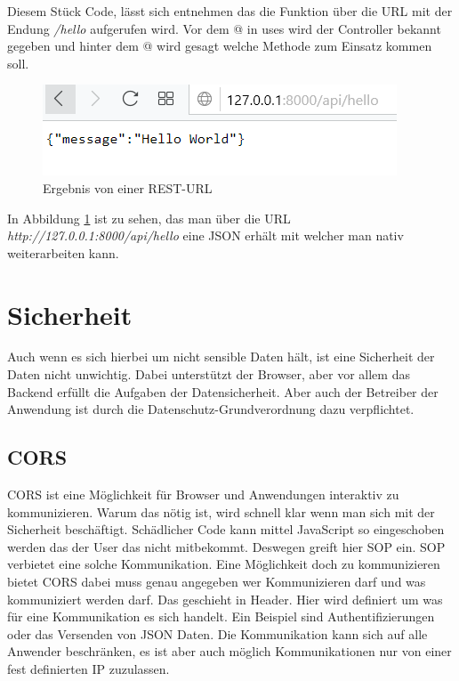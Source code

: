 Diesem Stück Code, lässt sich entnehmen das die Funktion über die \ac{URL} mit der Endung \textit{/hello} aufgerufen wird. Vor dem @ in uses wird der Controller bekannt gegeben und hinter dem @ wird gesagt welche Methode zum Einsatz kommen soll.

\begin{figure}[H]
	\centering
	\includegraphics{content/pictures/restresult.png}
	\caption{ Ergebnis von einer REST-URL}
	\label{fig:restresult}
\end{figure}

In Abbildung \ref{fig:restresult} ist zu sehen, das man über die \ac{URL} \textit{http://127.0.0.1:8000/api/hello} eine \ac{JSON} erhält mit welcher man nativ weiterarbeiten kann.


\section{Sicherheit}
Auch wenn es sich hierbei um nicht sensible Daten hält, ist eine Sicherheit der Daten nicht unwichtig. Dabei unterstützt der Browser, aber vor allem das Backend erfüllt die Aufgaben der Datensicherheit. Aber auch der Betreiber der Anwendung ist durch die Datenschutz-Grundverordnung dazu verpflichtet. \autocite{intersoftconsulting.2018} 

\subsection{CORS}
\ac{CORS} ist eine Möglichkeit für Browser und Anwendungen interaktiv zu kommunizieren. \autocite{Cors.2018} Warum das nötig ist, wird schnell klar wenn man sich mit der Sicherheit beschäftigt. Schädlicher Code kann mittel JavaScript so eingeschoben werden das der User das nicht mitbekommt. Deswegen greift hier \ac{SOP} ein. \ac{SOP} verbietet eine solche Kommunikation. \autocite{Mozilla.2018} Eine Möglichkeit doch zu kommunizieren bietet \ac{CORS} dabei muss genau angegeben wer Kommunizieren darf und was kommuniziert werden darf. Das geschieht in Header. Hier wird definiert um was für eine Kommunikation es sich handelt. Ein Beispiel sind Authentifizierungen oder das Versenden von \ac{JSON} Daten. Die Kommunikation kann sich auf alle Anwender beschränken, es ist aber auch möglich Kommunikationen nur von einer fest definierten \ac{IP} zuzulassen. 


